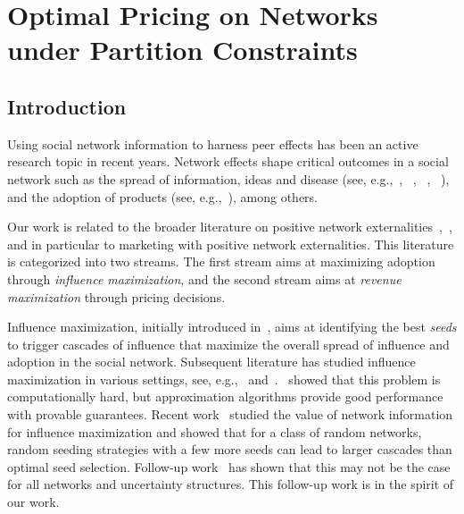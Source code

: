 \chapter{Optimal Pricing on Networks under Partition Constraints}\label{ch:pricing}


\section{Introduction}\label{sec:pricing:intro}

		Using social network information to harness peer effects has been an active research topic in recent years. Network effects shape critical outcomes in a social network such as the spread of information, ideas and disease (see, e.g.,~\cite{banerjee2013diffusion},
~\cite{pastor2001epidemic},
~\cite{muchnik2013social},
~\cite{chamley2004rational}), and the adoption of products (see, e.g.,~\cite{bapna2015your, rogers1976new, wang2016consumer}), among others.

	Our work is related to the broader literature on positive network externalities~\cite{farrell1985standardization},~\cite{katz1985network}, and in particular to marketing with positive network
	externalities. This literature is categorized into two streams. The first stream aims at maximizing adoption through {\it influence maximization}, and the second stream aims at {\it revenue maximization} through pricing decisions.
	
 Influence maximization, initially introduced in~\cite{domingos2001mining}, aims at identifying the best {\it seeds} to trigger cascades of influence that maximize the overall spread of influence and adoption in the social network. Subsequent literature has studied influence maximization in various settings, see, e.g.,~\cite{richardson2002mining} and~\cite{banerjee2013diffusion}.~\cite{kempe2003maximizing} showed that this problem is computationally hard, but approximation
	algorithms provide good performance with provable guarantees. Recent work~\cite{akbarpour2018} studied 
	the value of network information for influence maximization and showed that for a class of random networks, random seeding strategies with a few more seeds can lead to  larger cascades than optimal seed selection. Follow-up work~\cite{Jackson-Storms-2017} has shown that this may not be the case for all networks and uncertainty structures. This follow-up work is in the spirit of our work.
	
